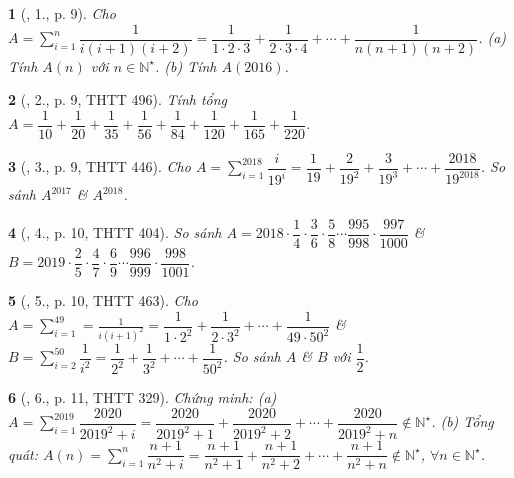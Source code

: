 \documentclass{article}
\newtheorem{baitoan}{}
\begin{document}
\begin{baitoan}[\cite{Lam_An_Tuan_Toan_9_dai_so}, 1., p. 9]
	Cho $A = \sum_{i=1}^n \dfrac{1}{i(i + 1)(i + 2)} = \dfrac{1}{1\cdot2\cdot3} + \dfrac{1}{2\cdot3\cdot4} + \cdots + \dfrac{1}{n(n + 1)(n + 2)}$. (a) Tính $A(n)$ với $n\in\mathbb{N}^\star$. (b) Tính $A(2016)$.
\end{baitoan}

\begin{baitoan}[\cite{Lam_An_Tuan_Toan_9_dai_so}, 2., p. 9, THTT 496]
	Tính tổng $A = \dfrac{1}{10} + \dfrac{1}{20} + \dfrac{1}{35} + \dfrac{1}{56} + \dfrac{1}{84} + \dfrac{1}{120} + \dfrac{1}{165} + \dfrac{1}{220}$.
\end{baitoan}

\begin{baitoan}[\cite{Lam_An_Tuan_Toan_9_dai_so}, 3., p. 9, THTT 446]
	Cho $A = \sum_{i=1}^{2018} \dfrac{i}{19^i} = \dfrac{1}{19} + \dfrac{2}{19^2} + \dfrac{3}{19^3} + \cdots + \dfrac{2018}{19^{2018}}$. So sánh $A^{2017}$ \& $A^{2018}$.
\end{baitoan}

\begin{baitoan}[\cite{Lam_An_Tuan_Toan_9_dai_so}, 4., p. 10, THTT 404]
	So sánh $A = 2018\cdot\dfrac{1}{4}\cdot\dfrac{3}{6}\cdot\dfrac{5}{8}\cdots\dfrac{995}{998}\cdot\dfrac{997}{1000}$ \& $B = 2019\cdot\dfrac{2}{5}\cdot\dfrac{4}{7}\cdot\dfrac{6}{9}\cdots\dfrac{996}{999}\cdot\dfrac{998}{1001}$.
\end{baitoan}

\begin{baitoan}[\cite{Lam_An_Tuan_Toan_9_dai_so}, 5., p. 10, THTT 463]
	Cho $A = \sum_{i=1}^{49} = \frac{1}{i(i + 1)^2} = \dfrac{1}{1\cdot2^2} + \dfrac{1}{2\cdot3^2} + \cdots + \dfrac{1}{49\cdot50^2}$ \& $B = \sum_{i=2}^{50} \dfrac{1}{i^2} = \dfrac{1}{2^2} + \dfrac{1}{3^2} + \cdots + \dfrac{1}{50^2}$. So sánh $A$ \& $B$ với $\dfrac{1}{2}$.
\end{baitoan}

\begin{baitoan}[\cite{Lam_An_Tuan_Toan_9_dai_so}, 6., p. 11, THTT 329]
	Chứng minh: (a) $A = \sum_{i=1}^{2019} \dfrac{2020}{2019^2 + i} = \dfrac{2020}{2019^2 + 1} + \dfrac{2020}{2019^2 + 2} + \cdots + \dfrac{2020}{2019^2 + n}\notin\mathbb{N}^\star$. (b) Tổng quát: $A(n) = \sum_{i=1}^n \dfrac{n + 1}{n^2 + i} = \dfrac{n + 1}{n^2 + 1} + \dfrac{n + 1}{n^2 + 2} + \cdots + \dfrac{n + 1}{n^2 + n}\notin\mathbb{N}^\star$, $\forall n\in\mathbb{N}^\star$.
\end{baitoan}
\end{document}
